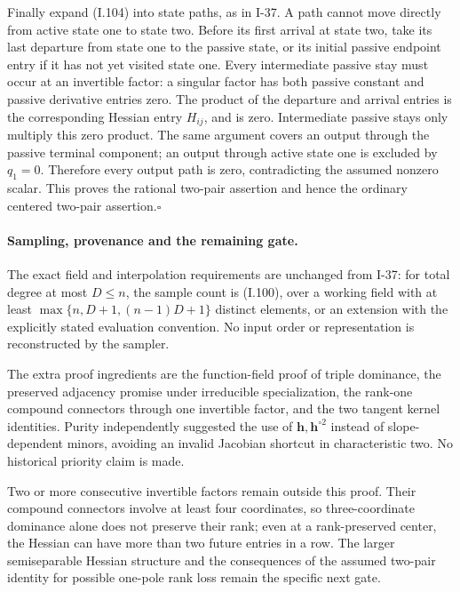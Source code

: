Finally expand (I.104) into state paths, as in I-37. A path
cannot move directly from active state one to state two.
Before its first arrival at state two, take its last departure
from state one to the passive state, or its initial passive
endpoint entry if it has not yet visited state one. Every
intermediate passive stay must occur at an invertible factor:
a singular factor has both passive constant and passive
derivative entries zero. The product of the departure and
arrival entries is the corresponding Hessian entry $H_{ij}$,
and is zero. Intermediate passive stays only multiply this
zero product. The same argument covers an output through the
passive terminal component; an output through active state one
is excluded by $q_1=0$. Therefore every output path is zero,
contradicting the assumed nonzero scalar. This proves the
rational two-pair assertion and hence the ordinary centered
two-pair assertion.\hfill$\square$

\paragraph{Sampling, provenance and the remaining gate.}
The exact field and interpolation requirements are unchanged
from I-37: for total degree at most $D\le n$, the sample count
is (I.100), over a working field with at least
$\max\{n,D+1,(n-1)D+1\}$ distinct elements, or an extension
with the explicitly stated evaluation convention. No input
order or representation is reconstructed by the sampler.

The extra proof ingredients are the function-field proof of
triple dominance, the preserved adjacency promise under
irreducible specialization, the rank-one compound connectors
through one invertible factor, and the two tangent kernel
identities. Purity independently suggested the use of
$\mathbf h,\mathbf h^{\circ2}$ instead of slope-dependent
minors, avoiding an invalid Jacobian shortcut in characteristic
two. No historical priority claim is made.

Two or more consecutive invertible factors remain outside
this proof. Their compound connectors involve at least four
coordinates, so three-coordinate dominance alone does not
preserve their rank; even at a rank-preserved center, the
Hessian can have more than two future entries in a row. The
larger semiseparable Hessian structure and the consequences
of the assumed two-pair identity for possible one-pole rank
loss remain the specific next gate.
